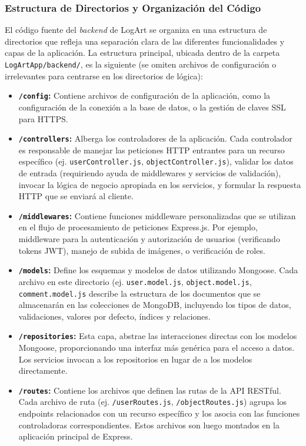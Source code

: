 \subsubsection{Estructura de Directorios y Organización del Código}
\label{sssec:estructuraBackend}

El código fuente del \textit{backend} de LogArt se organiza en una estructura de directorios que refleja una separación clara de las diferentes funcionalidades y capas de la aplicación. La estructura principal, ubicada dentro de la carpeta \texttt{LogArtApp/backend/}, es la siguiente (se omiten archivos de configuración o irrelevantes para centrarse en los directorios de lógica):

\begin{itemize}
    \item \textbf{\texttt{/config}:} Contiene archivos de configuración de la aplicación, como la configuración de la conexión a la base de datos, o la gestión de claves SSL para HTTPS.
    \item \textbf{\texttt{/controllers}:} Alberga los controladores de la aplicación. Cada controlador es responsable de manejar las peticiones HTTP entrantes para un recurso específico (ej. \texttt{userController.js}, \texttt{objectController.js}), validar los datos de entrada (requiriendo ayuda de middlewares y servicios de validación), invocar la lógica de negocio apropiada en los servicios, y formular la respuesta HTTP que se enviará al cliente.
    \item \textbf{\texttt{/middlewares}:} Contiene funciones middleware personalizadas que se utilizan en el flujo de procesamiento de peticiones Express.js. Por ejemplo, middleware para la autenticación y autorización de usuarios (verificando tokens JWT), manejo de subida de imágenes, o verificación de roles.
    \item \textbf{\texttt{/models}:} Define los esquemas y modelos de datos utilizando Mongoose. Cada archivo en este directorio (ej. \texttt{user.model.js}, \texttt{object.model.js}, \texttt{comment.model.js} describe la estructura de los documentos que se almacenarán en las colecciones de MongoDB, incluyendo los tipos de datos, validaciones, valores por defecto, índices y relaciones.
    \item \textbf{\texttt{/repositories}:} Esta capa, abstrae las interacciones directas con los modelos Mongoose, proporcionando una interfaz más genérica para el acceso a datos. Los servicios invocan a los repositorios en lugar de a los modelos directamente.
    \item \textbf{\texttt{/routes}:} Contiene los archivos que definen las rutas de la API RESTful. Cada archivo de ruta (ej. \texttt{/userRoutes.js}, \texttt{/objectRoutes.js}) agrupa los endpoints relacionados con un recurso específico y los asocia con las funciones controladoras correspondientes. Estos archivos son luego montados en la aplicación principal de Express.

\end{itemize}
